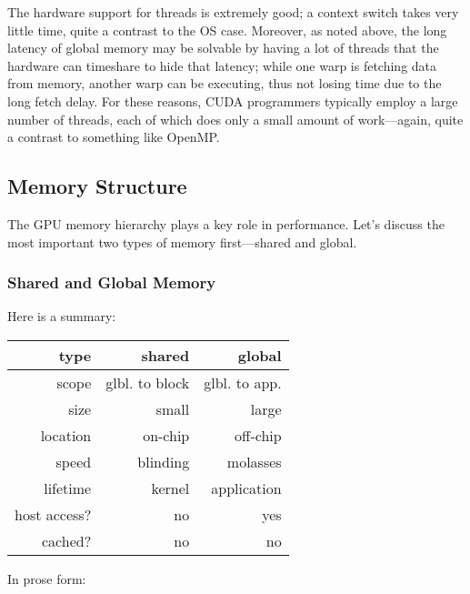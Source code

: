 The hardware support for threads is extremely good; a context switch
takes very little time, quite a contrast to the OS case.  Moreover, as
noted above, the long latency of global memory may be solvable by having
a lot of threads that the hardware can timeshare to hide that latency;
while one warp is fetching data from memory, another warp can be
executing, thus not losing time due to the long fetch delay.  For these
reasons, CUDA programmers typically employ a large number of threads,
each of which does only a small amount of work---again, quite a contrast
to something like OpenMP.

\subsection{Memory Structure}

The GPU memory hierarchy plays a key role in performance.  Let's discuss
the most important two types of memory first---shared and global.  

\subsubsection{Shared and Global Memory}

Here is a summary:

\begin{tabular}{|r|r|r|}
\hline
type & shared & global \\ \hline 
\hline
scope & glbl. to block  & glbl. to app. \\ \hline 
size & small & large \\ \hline 
location & on-chip & off-chip \\ \hline 
speed & blinding & molasses \\ \hline
lifetime & kernel & application \\ \hline 
host access? & no & yes \\ \hline 
cached? & no & no \\ \hline 
\end{tabular}

In prose form:


